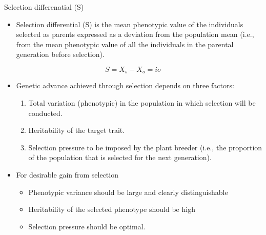 \documentclass[11pt,ignorenonframetext,aspectratio=169]{beamer}
\providecommand{\tightlist}{%
  \setlength{\itemsep}{0pt}\setlength{\parskip}{0pt}}
\begin{document}
\begin{frame}{Selection differenatial (S)}
\protect\hypertarget{selection-differenatial-s}{}
\begin{itemize}
\tightlist
\item
  \alert{Selection differential (S)} is the mean phenotypic value of the
  individuals selected as parents expressed as a deviation from the
  population mean (i.e., from the mean phenotypic value of all the
  individuals in the parental generation before selection).
\end{itemize}

\[
S = X_s - X_o = i \sigma
\]

\begin{itemize}
\tightlist
\item
  Genetic advance achieved through selection depends on three factors:

  \begin{enumerate}
  \footnotesize
  \item Total variation (phenotypic) in the population in which selection will be conducted.
  \item Heritability of the target trait.
  \item Selection pressure to be imposed by the plant breeder (i.e., the proportion of the population that is selected for the next generation).
  \end{enumerate}
\item
  For desirable gain from selection

  \begin{itemize}
  \footnotesize
  \item Phenotypic variance should be large and clearly distinguishable
  \item Heritability of the selected phenotype should be high
  \item Selection pressure should be optimal.
  \end{itemize}
\end{itemize}
\end{frame}
\end{document}
